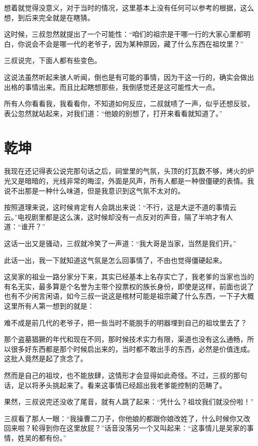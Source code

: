 想着就觉得没意义，对于当时的情况，这里基本上没有任何可以参考的根据，这么想，到后来完全就是在瞎猜。

这时候，三叔忽然就提出了一个可能性：“咱们的祖宗是干哪一行的大家心里都明白，你说会不会是哪一代的老爷子，因为某种原因，藏了什么东西在祖坟里？”

三叔说完，下面人都有些变色。

这说法虽然听起来骇人听闻，倒也是有可能的事情，因为干这一行的，确实会做出出格的事情出来。而且比起瞎想那些，我倒感觉还是这可能性大一点。

所有人你看看我，我看看你，不知道如何反应，二叔就啧了一声，似乎还想反驳，表公忽然就站起来，对我们道：“他娘的别想了，打开来看看就知道了。”

\chapter{乾坤}

我现在还记得表公说完那句话之后，祠堂里的气氛，头顶的灯瓦数不够，烤火的炉光又是暗暗的，光线非常的晦涩，外面是风声，所有人都是一种很僵硬的表情。我说不出那是一种什么味道，但是我意识到这气氛不太对的。

按照道理来说，这时候肯定有人会跳出来说：“不行，这是大逆不道的事情云云。”电视剧里都是这么演，这时候却没有一点反对的声音，隔了半响才有人道：“谁开？”

这话一出又是骚动，三叔就冷笑了一声道：“我大哥是当家，当然是我们开。”

此话一出，我一下就知道这气氛是怎么回事情了，不由也觉得僵硬起来。

这吴家的祖业一路分家分下来，其实已经基本上名存实亡了，我老爹的当家也当的有名无实，最多算是个名誉为主带个投票权的族长身份，即使是这样，前面也说了也有不少闲言闲语，如今三叔一说这是棺材可能是祖宗藏了什么东西，一下子大概这里所有人第一想到的就是：

难不成是前几代的老爷子，把一些当时不能脱手的明器埋到自己的祖坟里去了？

那个盗墓猖獗的年代和现在不同，那时候技术实力有限，渠道也没有这么通畅，所以很多好东西都是那个时候启出来的，当时都不敢出手的东西，必然是价值连成。这批人竟然是起了贪念了。

然而是自己的祖坟，也不能放肆，这情形才会显得如此奇怪。不过，三叔的那句话，足以将矛头挑起来了。看来这事情已经超出我老爹能控制的范畴了。

果然，三叔说完还没收了尾音，就有人跳了起来：“凭什么？祖坟我们就没份啦！”

三叔看了那人一眼：“我操曹二刀子，你他娘的都跟你娘改姓了，什么时候你又改回来啦？轮得到你在这里放屁？”话音没落另一个又叫起来：“这事情儿是吴家的事情，姓吴的都有份。”

